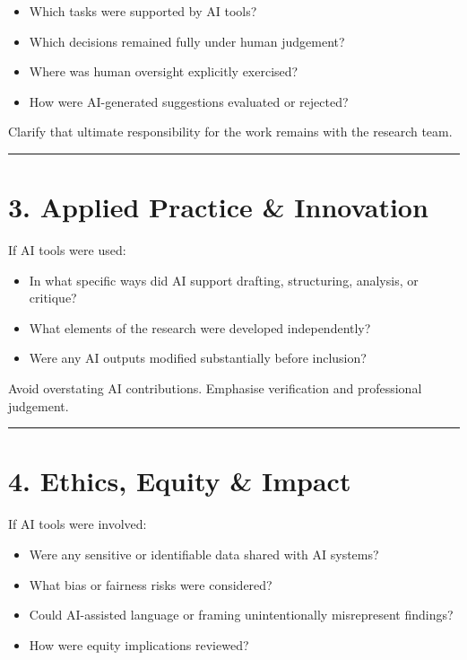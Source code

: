 \documentclass[
]{report}
\providecommand{\tightlist}{%
  \setlength{\itemsep}{0pt}\setlength{\parskip}{0pt}}
\begin{document}
\begin{itemize}
\tightlist
\item
  Which tasks were supported by AI tools?
\item
  Which decisions remained fully under human judgement?
\item
  Where was human oversight explicitly exercised?
\item
  How were AI-generated suggestions evaluated or rejected?
\end{itemize}

Clarify that ultimate responsibility for the work remains with the
research team.

\begin{center}\rule{0.5\linewidth}{0.5pt}\end{center}

\section{3. Applied Practice \&
Innovation}\label{applied-practice-innovation}

If AI tools were used:

\begin{itemize}
\tightlist
\item
  In what specific ways did AI support drafting, structuring, analysis,
  or critique?
\item
  What elements of the research were developed independently?
\item
  Were any AI outputs modified substantially before inclusion?
\end{itemize}

Avoid overstating AI contributions. Emphasise verification and
professional judgement.

\begin{center}\rule{0.5\linewidth}{0.5pt}\end{center}

\section{4. Ethics, Equity \& Impact}\label{ethics-equity-impact}

If AI tools were involved:

\begin{itemize}
\tightlist
\item
  Were any sensitive or identifiable data shared with AI systems?
\item
  What bias or fairness risks were considered?
\item
  Could AI-assisted language or framing unintentionally misrepresent
  findings?
\item
  How were equity implications reviewed?
\end{itemize}
\end{document}
